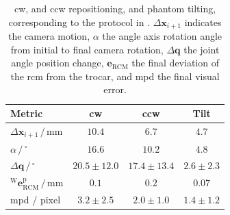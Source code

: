 \begin{table}
\centering
\caption{\gls{cw}, and \gls{ccw} repositioning, and phantom tilting, corresponding to the protocol in . $\Delta\mathbf{x}_{i+1}$ indicates the camera motion, $\alpha$ the angle axis rotation angle from initial to final camera rotation, $\Delta\mathbf{q}$ the joint angle position change, $\mathbf{e}_\text{RCM}$ the final deviation of the \gls{rcm} from the trocar, and \gls{mpd} the final visual error.}
\begin{tabular}{lccc}
    \toprule
     Metric & \gls{cw} & \gls{ccw} & Tilt \\
     \hline
     $\Delta\mathbf{x}_{i+1}\,/\,\text{mm}$ & $10.4$ & $6.7$ & $4.7$ \\
     \hline
     $\alpha\,/\,^\circ$ & $16.6$ & $10.2$ & $4.8$ \\
     \hline
     $\Delta\mathbf{q}\,/\,^\circ$ & $20.5\pm12.0$ & $17.4\pm13.4$ & $2.6 \pm 2.3$ \\
     \hline
     $^\text{W}\mathbf{e}^\text{p}_\text{RCM}\,/\,\text{mm}$& $0.1$ & $0.2$ & $0.07$ \\
     \hline
     \gls{mpd} / pixel & $3.2\pm2.5$ & $2.0\pm1.0$ & $1.4\pm1.2$ \\
     \bottomrule
\end{tabular}
\label{c2:tab:repositioning}
\end{table}
%    

